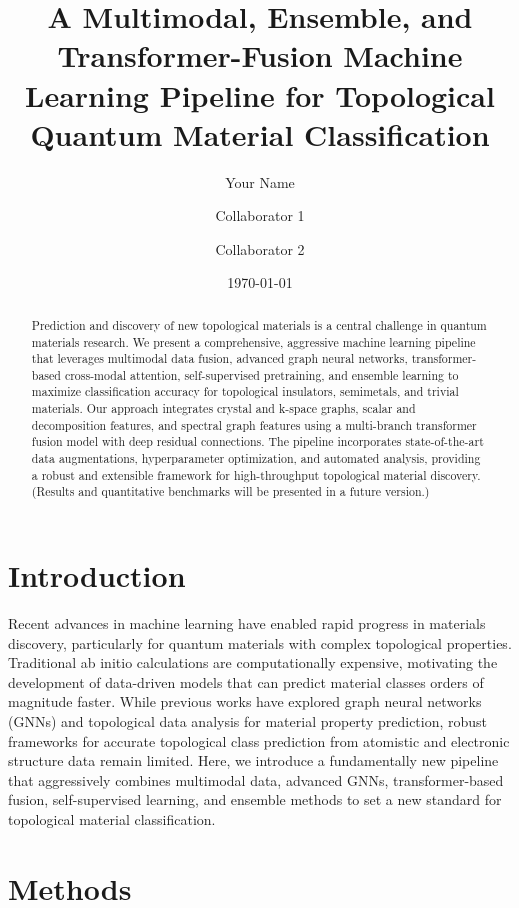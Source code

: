 \documentclass[12pt]{article}
\title{A Multimodal, Ensemble, and Transformer-Fusion Machine Learning Pipeline for Topological Quantum Material Classification}
\author[1]{Your Name}
\author[2]{Collaborator 1}
\author[3]{Collaborator 2}
\affil[1]{Department of Physics, Your University, Your City, Country}
\affil[2]{Department of Materials Science, Collaborator University, City, Country}
\affil[3]{Department of Computer Science, Collaborator University, City, Country}
\date{\today}
\begin{document}
\maketitle

\begin{abstract}
Prediction and discovery of new topological materials is a central challenge in quantum materials research. We present a comprehensive, aggressive machine learning pipeline that leverages multimodal data fusion, advanced graph neural networks, transformer-based cross-modal attention, self-supervised pretraining, and ensemble learning to maximize classification accuracy for topological insulators, semimetals, and trivial materials. Our approach integrates crystal and k-space graphs, scalar and decomposition features, and spectral graph features using a multi-branch transformer fusion model with deep residual connections. The pipeline incorporates state-of-the-art data augmentations, hyperparameter optimization, and automated analysis, providing a robust and extensible framework for high-throughput topological material discovery. (Results and quantitative benchmarks will be presented in a future version.)
\end{abstract}

\section{Introduction}
Recent advances in machine learning have enabled rapid progress in materials discovery, particularly for quantum materials with complex topological properties. Traditional ab initio calculations are computationally expensive, motivating the development of data-driven models that can predict material classes orders of magnitude faster. While previous works have explored graph neural networks (GNNs) and topological data analysis for material property prediction, robust frameworks for accurate topological class prediction from atomistic and electronic structure data remain limited. Here, we introduce a fundamentally new pipeline that aggressively combines multimodal data, advanced GNNs, transformer-based fusion, self-supervised learning, and ensemble methods to set a new standard for topological material classification.

\section{Methods}
\end{document}
